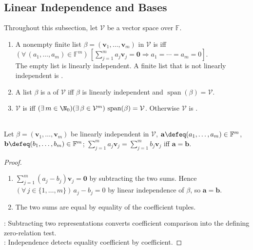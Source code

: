 \subsection{Linear Independence and Bases}

Throughout this subsection, let $\mathcal{V}$ be a vector space over $\mathbb{F}$.

\begin{definition} \label{def:linear-independence-basis-dimension} 
\begin{enumerate}[label=(\roman*)]
\setlength{\itemsep}{0pt}
\item A nonempty finite list $\beta=(\mathbf{v}_1,\ldots,\mathbf{v}_m)$ in $\mathcal{V}$ is  iff $(\forall\,(a_1,\ldots,a_m)\in\mathbb{F}^m)\,[\sum\limits_{j=1}^{m}a_j\mathbf{v}_j=\mathbf{0}\Rightarrow a_1=\cdots=a_m=0]$.\\
The empty list is linearly independent. A finite list that is not linearly independent is .
\item A list $\beta$ is a  of $\mathcal{V}$ iff $\beta$ is linearly independent and $\operatorname{span}(\beta)=\mathcal{V}$.
\item $\mathcal{V}$ is  iff $(\exists\,m\in\N_0)(\exists\,\beta\in\mathcal{V}^m)\,\operatorname{span}(\beta)=\mathcal{V}$. Otherwise $\mathcal{V}$ is .
\end{enumerate}
\end{definition}

\begin{proposition} \label{prop:uniquecoefficientsindependentlist} \\
Let $\beta=(\mathbf{v}_1,\ldots,\mathbf{v}_m)$ be linearly independent in $\mathcal{V}$, $\mathbf{a}\defeq(a_1,\ldots,a_m)\in\mathbb{F}^m$, $\mathbf{b}\defeq(b_1,\ldots,b_m)\in\mathbb{F}^m$; $\sum\limits_{j=1}^{m}a_j\mathbf{v}_j=\sum\limits_{j=1}^{m}b_j\mathbf{v}_j$ iff $\mathbf{a}=\mathbf{b}$.
\begin{proof}
\begin{enumerate}[label=\roman*.]
\setlength{\itemsep}{0pt}
\item[$(\Rightarrow)$] $\sum\limits_{j=1}^{m}(a_j-b_j)\mathbf{v}_j=\mathbf{0}$ by subtracting the two sums. Hence $(\forall\,j\in\{1,\ldots,m\})\,a_j-b_j=0$ by linear independence of $\beta$, so $\mathbf{a}=\mathbf{b}$.
\item[$(\Leftarrow)$] The two sums are equal by equality of the coefficient tuples.
\end{enumerate}
: Subtracting two representations converts coefficient comparison into the defining zero-relation test.\\
: Independence detects equality coefficient by coefficient.
\end{proof}
\end{proposition}

